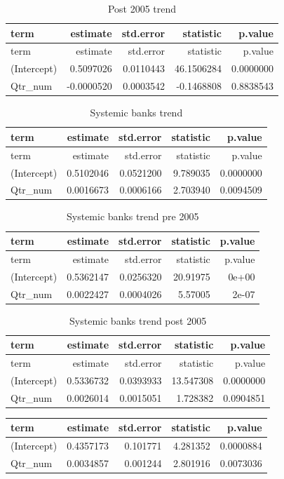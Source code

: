 \documentclass[11pt,]{article}
\begin{document}
\begin{longtable}[]{@{}lrrrr@{}}
\caption{Post 2005 trend}\tabularnewline
\toprule
term & estimate & std.error & statistic & p.value\tabularnewline
\midrule
\endfirsthead
\toprule
term & estimate & std.error & statistic & p.value\tabularnewline
\midrule
\endhead
(Intercept) & 0.5097026 & 0.0110443 & 46.1506284 &
0.0000000\tabularnewline
Qtr\_num & -0.0000520 & 0.0003542 & -0.1468808 &
0.8838543\tabularnewline
\bottomrule
\end{longtable}

\begin{longtable}[]{@{}lrrrr@{}}
\caption{Systemic banks trend}\tabularnewline
\toprule
term & estimate & std.error & statistic & p.value\tabularnewline
\midrule
\endfirsthead
\toprule
term & estimate & std.error & statistic & p.value\tabularnewline
\midrule
\endhead
(Intercept) & 0.5102046 & 0.0521200 & 9.789035 &
0.0000000\tabularnewline
Qtr\_num & 0.0016673 & 0.0006166 & 2.703940 & 0.0094509\tabularnewline
\bottomrule
\end{longtable}

\begin{longtable}[]{@{}lrrrr@{}}
\caption{Systemic banks trend pre 2005}\tabularnewline
\toprule
term & estimate & std.error & statistic & p.value\tabularnewline
\midrule
\endfirsthead
\toprule
term & estimate & std.error & statistic & p.value\tabularnewline
\midrule
\endhead
(Intercept) & 0.5362147 & 0.0256320 & 20.91975 & 0e+00\tabularnewline
Qtr\_num & 0.0022427 & 0.0004026 & 5.57005 & 2e-07\tabularnewline
\bottomrule
\end{longtable}

\begin{longtable}[]{@{}lrrrr@{}}
\caption{Systemic banks trend post 2005}\tabularnewline
\toprule
term & estimate & std.error & statistic & p.value\tabularnewline
\midrule
\endfirsthead
\toprule
term & estimate & std.error & statistic & p.value\tabularnewline
\midrule
\endhead
(Intercept) & 0.5336732 & 0.0393933 & 13.547308 &
0.0000000\tabularnewline
Qtr\_num & 0.0026014 & 0.0015051 & 1.728382 & 0.0904851\tabularnewline
\bottomrule
\end{longtable}

\begin{longtable}[]{@{}lrrrr@{}}
\toprule
term & estimate & std.error & statistic & p.value\tabularnewline
\midrule
\endhead
(Intercept) & 0.4357173 & 0.101771 & 4.281352 & 0.0000884\tabularnewline
Qtr\_num & 0.0034857 & 0.001244 & 2.801916 & 0.0073036\tabularnewline
\bottomrule
\end{longtable}
\end{document}
